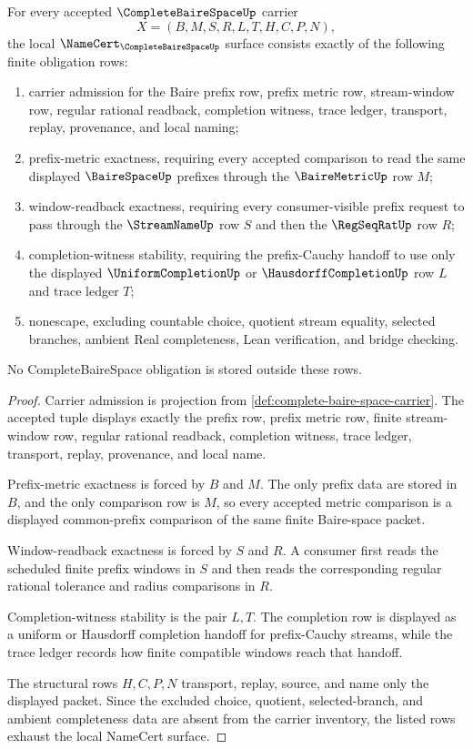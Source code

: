\begin{theorem}
\label{thm:complete-baire-space-namecert-obligations}
For every accepted $\CompleteBaireSpaceUp$ carrier
$$
X=(B,M,S,R,L,T,H,C,P,N),
$$
the local $\NameCert_{\CompleteBaireSpaceUp}$ surface consists exactly of the following finite obligation rows:
\begin{enumerate}
\item carrier admission for the Baire prefix row, prefix metric row, stream-window row, regular rational readback, completion witness, trace ledger, transport, replay, provenance, and local naming;
\item prefix-metric exactness, requiring every accepted comparison to read the same displayed $\BaireSpaceUp$ prefixes through the $\BaireMetricUp$ row $M$;
\item window-readback exactness, requiring every consumer-visible prefix request to pass through the $\StreamNameUp$ row $S$ and then the $\RegSeqRatUp$ row $R$;
\item completion-witness stability, requiring the prefix-Cauchy handoff to use only the displayed $\UniformCompletionUp$ or $\HausdorffCompletionUp$ row $L$ and trace ledger $T$;
\item nonescape, excluding countable choice, quotient stream equality, selected branches, ambient Real completeness, Lean verification, and bridge checking.
\end{enumerate}
No CompleteBaireSpace obligation is stored outside these rows.
\end{theorem}
\begin{proof}
Carrier admission is projection from \autoref{def:complete-baire-space-carrier}. The accepted tuple displays exactly the prefix row, prefix metric row, finite stream-window row, regular rational readback, completion witness, trace ledger, transport, replay, provenance, and local name.

Prefix-metric exactness is forced by $B$ and $M$. The only prefix data are stored in $B$, and the only comparison row is $M$, so every accepted metric comparison is a displayed common-prefix comparison of the same finite Baire-space packet.

Window-readback exactness is forced by $S$ and $R$. A consumer first reads the scheduled finite prefix windows in $S$ and then reads the corresponding regular rational tolerance and radius comparisons in $R$.

Completion-witness stability is the pair $L,T$. The completion row is displayed as a uniform or Hausdorff completion handoff for prefix-Cauchy streams, while the trace ledger records how finite compatible windows reach that handoff.

The structural rows $H,C,P,N$ transport, replay, source, and name only the displayed packet. Since the excluded choice, quotient, selected-branch, and ambient completeness data are absent from the carrier inventory, the listed rows exhaust the local NameCert surface.
\end{proof}

